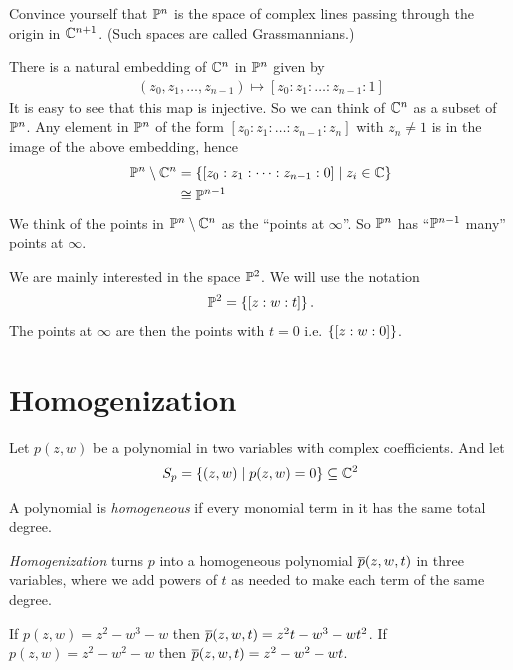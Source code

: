 \documentclass{article}
\begin{document}
\begin{qbox}
  Convince yourself that $\mathbb{P}^n$ is the space of complex lines passing through the origin in $\mathbb{C}^{n+1}$. (Such spaces are called Grassmannians.)
\end{qbox}

There is a natural embedding of $\mathbb{C}^n$ in $\mathbb{P}^{n}$ given by
\begin{align*}
  (z_0, z_1, \dots, z_{n-1}) \longmapsto [z_0 : z_1 : \dots : z_{n-1} : 1]
\end{align*}
It is easy to see that this map is injective. So we can think of $\mathbb{C}^n$ as a subset of $\mathbb{P}^n$.
Any element in $\mathbb{P}^n$ of the form $[z_0 : z_1 : \dots : z_{n-1} : z_n]$ with $z_n \neq 1$ is in the image of the above embedding, hence
\begin{align*}
  \mathbb{P}^n \setminus \mathbb{C}^n
  &= \left\{ [z_0 : z_1 : \dots : z_{n-1} : 0] \mid z_i \in \mathbb{C}\right\} \\
  &\cong \mathbb{P}^{n-1}
\end{align*}
We think of the points in $\mathbb{P}^n \setminus \mathbb{C}^n$ as the ``points at $\infty$''.
So $\mathbb{P}^n$ has ``$\mathbb{P}^{n-1}$ many'' points at $\infty$.

We are mainly interested in the space $\mathbb{P}^2$.
We will use the notation
\begin{align*}
  \mathbb{P}^2 = \left\{ [z : w : t] \right\}.
\end{align*}
The points at $\infty$ are then the points with $t = 0$ i.e. $\left\{[z:w:0]\right\}$.










\section{Homogenization}
Let $p(z,w)$ be a polynomial in two variables with complex coefficients.
And let
\begin{align*}
  S_p = \left\{(z,w) \mid  p(z,w) = 0\right\} \subseteq \mathbb{C}^2
\end{align*}
\begin{definition}
  A polynomial is \emph{homogeneous} if every monomial term in it has the same total degree.
\end{definition}
\emph{Homogenization} turns $p$ into a homogeneous polynomial $\overline{p}(z,w,t)$ in three variables, where we add powers of $t$ as needed to make each term of the same degree.
\begin{ex}
  If $p(z,w) = z^2 - w^3 - w$ then $\overline{p}(z,w,t) = z^2t - w^3 - wt^2$.
  If $p(z,w) = z^2 - w^2 - w$ then $\overline{p}(z,w,t) = z^2 - w^2 - wt$.
\end{ex}
\end{document}
